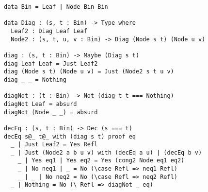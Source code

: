 \begin{verbatim}
data Bin = Leaf | Node Bin Bin

data Diag : (s, t : Bin) -> Type where
  Leaf2 : Diag Leaf Leaf
  Node2 : (s, t, u, v : Bin) -> Diag (Node s t) (Node u v)

diag : (s, t : Bin) -> Maybe (Diag s t)
diag Leaf Leaf = Just Leaf2
diag (Node s t) (Node u v) = Just (Node2 s t u v)
diag _ _ = Nothing

diagNot : (t : Bin) -> Not (diag t t === Nothing)
diagNot Leaf = absurd
diagNot (Node _ _) = absurd

decEq : (s, t : Bin) -> Dec (s === t)
decEq s@_ t@_ with (diag s t) proof eq
  _ | Just Leaf2 = Yes Refl
  _ | Just (Node2 a b u v) with (decEq a u) | (decEq b v)
    _ | Yes eq1 | Yes eq2 = Yes (cong2 Node eq1 eq2)
    _ | No neq1 | _ = No (\case Refl => neq1 Refl)
    _ | _ | No neq2 = No (\case Refl => neq2 Refl)
  _ | Nothing = No (\ Refl => diagNot _ eq)
\end{verbatim}
